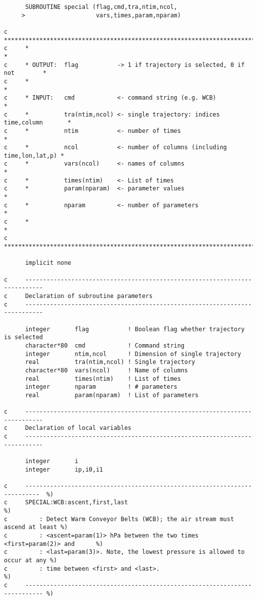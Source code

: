 \documentclass[a4paper,10pt]{article}
\begin{document}
\begin{itemize}
\begin{small}
\begin{verbatim}
      SUBROUTINE special (flag,cmd,tra,ntim,ncol,
     >                    vars,times,param,nparam)

c     ***************************************************************************
c     *                                                                         *
c     * OUTPUT:  flag           -> 1 if trajectory is selected, 0 if not        *
c     *                                                                         *
c     * INPUT:   cmd            <- command string (e.g. WCB)                    *
c     *          tra(ntim,ncol) <- single trajectory: indices time,column       *
c     *          ntim           <- number of times                              *
c     *          ncol           <- number of columns (including time,lon,lat,p) *
c     *          vars(ncol)     <- names of columns                             *
c     *          times(ntim)    <- List of times
c     *          param(nparam)  <- parameter values                             *
c     *          nparam         <- number of parameters                         *
c     *                                                                         *
c     ***************************************************************************

      implicit none
      
c     ---------------------------------------------------------------------------
c     Declaration of subroutine parameters
c     ---------------------------------------------------------------------------

      integer       flag           ! Boolean flag whether trajectory is selected
      character*80  cmd            ! Command string
      integer       ntim,ncol      ! Dimension of single trajectory
      real          tra(ntim,ncol) ! Single trajectory
      character*80  vars(ncol)     ! Name of columns
      real          times(ntim)    ! List of times
      integer       nparam         ! # parameters
      real          param(nparam)  ! List of parameters

c     ---------------------------------------------------------------------------
c     Declaration of local variables
c     ---------------------------------------------------------------------------

      integer       i
      integer       ip,i0,i1

c     --------------------------------------------------------------------------  %)
c     SPECIAL:WCB:ascent,first,last                                               %)
c         : Detect Warm Conveyor Belts (WCB); the air stream must ascend at least %)
c         : <ascent=param(1)> hPa between the two times <first=param(2)> and      %)
c         : <last=param(3)>. Note, the lowest pressure is allowed to occur at any %)
c         : time between <first> and <last>.                                      %)
c     --------------------------------------------------------------------------- %)


\end{verbatim}
\end{small}
\end{itemize}
\end{document}
